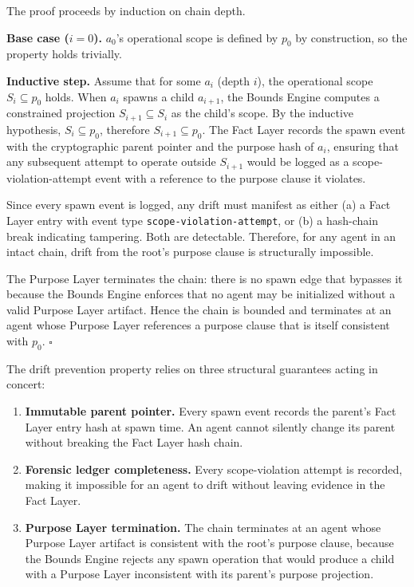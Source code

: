\begin{Proof}[Sketch]
The proof proceeds by induction on chain depth.

\textbf{Base case ($i = 0$).} $a_0$'s operational scope is defined by $p_0$ by construction, so the property holds trivially.

\textbf{Inductive step.} Assume that for some $a_i$ (depth $i$), the operational scope $S_i \subseteq p_0$ holds. When $a_i$ spawns a child $a_{i+1}$, the Bounds Engine computes a constrained projection $S_{i+1} \subseteq S_i$ as the child's scope. By the inductive hypothesis, $S_i \subseteq p_0$, therefore $S_{i+1} \subseteq p_0$. The Fact Layer records the spawn event with the cryptographic parent pointer and the purpose hash of $a_i$, ensuring that any subsequent attempt to operate outside $S_{i+1}$ would be logged as a scope-violation-attempt event with a reference to the purpose clause it violates.

Since every spawn event is logged, any drift must manifest as either (a) a Fact Layer entry with event type \texttt{scope-violation-attempt}, or (b) a hash-chain break indicating tampering. Both are detectable. Therefore, for any agent in an intact chain, drift from the root's purpose clause is structurally impossible.

The Purpose Layer terminates the chain: there is no spawn edge that bypasses it because the Bounds Engine enforces that no agent may be initialized without a valid Purpose Layer artifact. Hence the chain is bounded and terminates at an agent whose Purpose Layer references a purpose clause that is itself consistent with $p_0$. $\square$
\end{Proof}

The drift prevention property relies on three structural guarantees acting in concert:

\begin{enumerate}
    \item \textbf{Immutable parent pointer.} Every spawn event records the parent's Fact Layer entry hash at spawn time. An agent cannot silently change its parent without breaking the Fact Layer hash chain.
    \item \textbf{Forensic ledger completeness.} Every scope-violation attempt is recorded, making it impossible for an agent to drift without leaving evidence in the Fact Layer.
    \item \textbf{Purpose Layer termination.} The chain terminates at an agent whose Purpose Layer artifact is consistent with the root's purpose clause, because the Bounds Engine rejects any spawn operation that would produce a child with a Purpose Layer inconsistent with its parent's purpose projection.
\end{enumerate}

